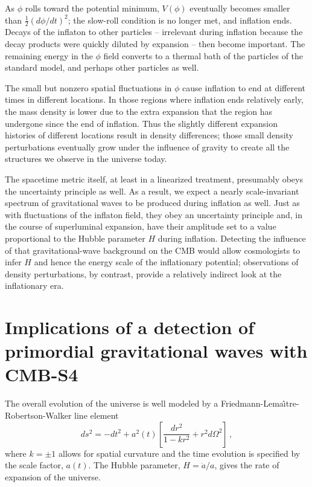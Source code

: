 As $\phi$ rolls toward the potential minimum, $V(\phi)$ eventually becomes smaller than $\frac{1}{2}(d\phi/dt)^2$; the slow-roll condition is no longer met, and inflation ends. Decays of the inflaton to other particles -- irrelevant during inflation because the decay products were quickly diluted by expansion -- then become important. The remaining energy in the $\phi$ field converts to a thermal bath of the particles of the standard model, and perhaps other particles as well.

The small but nonzero spatial fluctuations in $\phi$ cause inflation to end at different times in different locations. In those regions where inflation ends relatively early, the mass density is lower due to the extra expansion that the region has undergone since the end of inflation. Thus the slightly different expansion histories of different locations result in density differences; those small density perturbations eventually grow under the influence of gravity to create all the structures we observe in the universe today.

The spacetime metric itself, at least in a linearized treatment, presumably obeys the uncertainty principle as well. As a result, we expect a nearly scale-invariant spectrum of gravitational waves to be produced during inflation as well. Just as with fluctuations of the inflaton field, they obey an uncertainty principle and, in the course of superluminal expansion, have their amplitude set to a value proportional to the Hubble parameter $H$ during inflation. Detecting the influence of that gravitational-wave background on the CMB would allow cosmologists to infer $H$ and hence the energy scale of the inflationary potential; observations of density perturbations, by contrast, provide a relatively indirect look at the inflationary era.


\section{Implications of a detection of primordial gravitational waves with CMB-S4}
\label{sec:detection}
The overall evolution of the universe is well modeled by a Friedmann-Lema\^{\i}tre-Robertson-Walker line element
\begin{equation}
ds^2=-dt^2+a^2(t)\left[\frac{dr^2}{1-kr^2}+r^2d\Omega^2\right]\,,
\end{equation}
where $k=\pm1$ allows for spatial curvature and the time evolution is specified by the scale factor, $a(t)$. The Hubble parameter, $H=\dot{a}/a$, gives the rate of expansion of the universe. 

